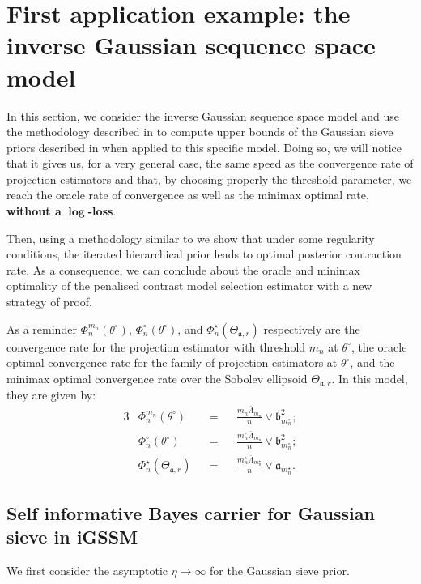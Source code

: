 \section{First application example: the inverse Gaussian sequence space model}\label{BAYES_GAUSS}

In this section, we consider the inverse Gaussian sequence space model and use the methodology described in  to compute upper bounds of the Gaussian sieve priors described in  when applied to this specific model.
Doing so, we will notice that it gives us, for a very general case, the same speed as the convergence rate of projection estimators and that, by choosing properly the threshold parameter, we reach the oracle rate of convergence as well as the minimax optimal rate, \textbf{without a} $\boldsymbol{\log}$\textbf{-loss}.

Then, using a methodology similar to  we show that under some regularity conditions, the iterated hierarchical prior leads to optimal posterior contraction rate.
As a consequence, we can conclude about the oracle and minimax optimality of the penalised contrast model selection estimator with a new strategy of proof.

\medskip

As a reminder $\Phi_{n}^{m_{n}}(\theta^{\circ})$, $\Phi_{n}^{\circ}(\theta^{\circ})$, and $\Phi_{n}^{\star}(\Theta_{\mathfrak{a}, r})$ respectively are the convergence rate for the projection estimator with threshold $m_{n}$ at $\theta^{\circ}$, the oracle optimal convergence rate for the family of projection estimators at $\theta^{\circ}$, and the minimax optimal convergence rate over the Sobolev ellipsoid $\Theta_{\mathfrak{a}, r}$.
In this model, they are given by:
\begin{alignat*}{3}
& \Phi_{n}^{m_{n}}(\theta^{\circ}) &&=&& \frac{m_{n} \overline{\Lambda}_{m_{n}}}{n} \vee \mathfrak{b}_{m_{n}^{\circ}}^{2};\\
& \Phi_{n}^{\circ}(\theta^{\circ}) &&=&& \frac{m_{n}^{\circ} \overline{\Lambda}_{m_{n}^{\circ}}}{n} \vee \mathfrak{b}_{m_{n}^{\circ}}^{2};\\
& \Phi_{n}^{\star}(\Theta_{\mathfrak{a}, r}) &&=&& \frac{m_{n}^{\star} \overline{\Lambda}_{m_{n}^{\star}}}{n} \vee \mathfrak{a}_{m_{n}^{\star}}.
\end{alignat*}

\subsection{Self informative Bayes carrier for Gaussian sieve in iGSSM}\label{BAYES_GAUSS_SELFINFORM}
We first consider the asymptotic $\eta \rightarrow \infty$ for the Gaussian sieve prior.


